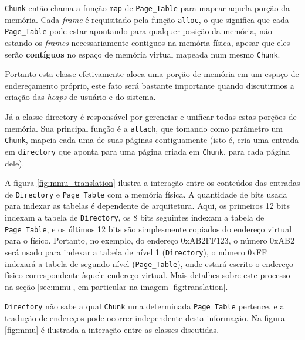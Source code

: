 \verb+Chunk+ então chama a função \verb+map+ de \verb+Page_Table+ para mapear aquela porção da memória. Cada \emph{frame} é requisitado pela função \verb+alloc+, o que significa que cada \verb+Page_Table+ pode estar apontando para qualquer posição da memória, não estando os \emph{frames} necessariamente contiguos na memória física, apesar que eles serão \textbf{contíguos} no espaço de memória virtual mapeada num mesmo \verb+Chunk+.

Portanto esta classe efetivamente aloca uma porção de memória em um espaço de endereçamento próprio, este fato será bastante importante quando discutirmos a criação das \emph{heaps} de usuário e do sistema.

Já a classe directory é responsável por gerenciar e unificar todas estas porções de memória. Sua principal função é a \verb+attach+, que tomando como parâmetro um \verb+Chunk+, mapeia cada uma de suas páginas contiguamente (isto é, cria uma entrada em \verb=directory= que aponta para uma página criada em \verb+Chunk+, para cada página dele).

A figura \ref{fig:mmu_translation} ilustra a interação entre os conteúdos das entradas de \verb+Directory+ e \verb+Page_Table+ com a memória física. A quantidade de bits usada para indexar as tabelas é dependente de arquitetura. Aqui, os primeiros 12 bits indexam a tabela de \verb+Directory+, os 8 bits seguintes indexam a tabela de \verb+Page_Table+, e os últimos 12 bits são simplesmente copiados do endereço virtual para o físico.
Portanto, no exemplo, do endereço 0xAB2FF123, o número 0xAB2 será usado para indexar a tabela de nível 1 (\verb=Directory=), o número 0xFF indexará a tabela de segundo nível (\verb+Page_Table+), onde estará escrito o endereço físico correspondente àquele endereço virtual.
Mais detalhes sobre este processo na seção \ref{sec:mmu}, em particular na imagem \ref{fig:translation}.




\verb+Directory+ não sabe a qual \verb+Chunk+ uma determinada \verb+Page_Table+ pertence, e a tradução de endereços pode ocorrer independente desta informação. Na figura \ref{fig:mmu} é ilustrada a interação entre as classes discutidas.



